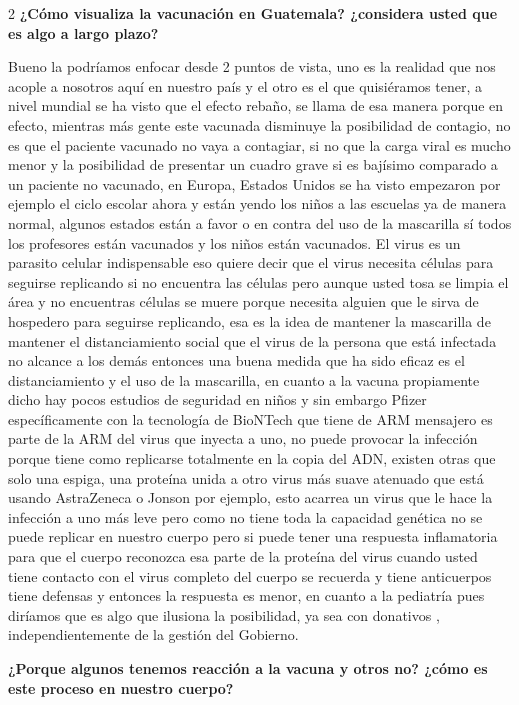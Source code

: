 \documentclass[12pt,spanish,Letterpaper,openany]{book}
\begin{document}
\begin {multicols}{2}
\textbf{¿Cómo visualiza la vacunación en Guatemala? ¿considera usted que es algo a largo plazo?}

Bueno la podríamos enfocar desde 2 puntos de vista, uno es la realidad que nos acople a
nosotros aquí en nuestro país y el otro es el que quisiéramos tener, a nivel mundial se ha
visto que el efecto rebaño, se llama de esa manera porque en efecto, mientras más gente este
vacunada disminuye la posibilidad de contagio, no es que el paciente vacunado no vaya a
contagiar, si no que la carga viral es mucho menor y la posibilidad de presentar un cuadro
grave si es bajísimo comparado a un paciente no vacunado, en Europa, Estados Unidos se ha
visto empezaron por ejemplo el ciclo escolar ahora y están yendo los niños a las escuelas ya
de manera normal, algunos estados están a favor o en contra del uso de la mascarilla sí todos
los profesores están vacunados y los niños están vacunados. El virus es un parasito celular
indispensable eso quiere decir que el virus necesita células para seguirse replicando si no
encuentra las células pero aunque usted tosa se limpia el área y no encuentras células se
muere porque necesita alguien que le sirva de hospedero para seguirse replicando, esa es la
idea de mantener la mascarilla de mantener el distanciamiento social que el virus de la
persona que está infectada no alcance a los demás entonces una buena medida que ha sido
eficaz es el distanciamiento y el uso de la mascarilla, en cuanto a la vacuna propiamente
dicho hay pocos estudios de seguridad en niños y sin embargo Pfizer específicamente con la
tecnología de BioNTech que tiene de ARM mensajero es parte de la ARM del virus que
inyecta a uno, no puede provocar la infección porque tiene como replicarse totalmente en la
copia del ADN, existen otras que solo una espiga, una proteína unida a otro virus más suave
atenuado que está usando AstraZeneca o Jonson por ejemplo, esto acarrea un virus que le
hace la infección a uno más leve pero como no tiene toda la capacidad genética no se puede
replicar en nuestro cuerpo pero si puede tener una respuesta inflamatoria para que el cuerpo
reconozca esa parte de la proteína del virus cuando usted tiene contacto con el virus completo
del cuerpo se recuerda y tiene anticuerpos tiene defensas y entonces la respuesta es menor,
en cuanto a la pediatría pues diríamos que es algo que ilusiona la posibilidad, ya sea con
donativos , independientemente de la gestión del Gobierno.

\textbf{¿Porque algunos tenemos reacción a la vacuna y otros no? ¿cómo es este proceso en nuestro cuerpo?}


\end{multicols}
\end{document}
